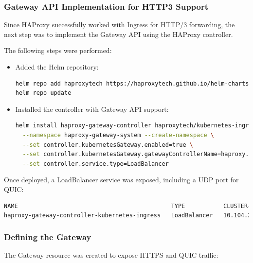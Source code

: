 \subsubsection{Gateway API Implementation for HTTP3 Support}

Since HAProxy successfully worked with Ingress for HTTP/3 forwarding, the next step was to implement the Gateway API using the HAProxy controller.


The following steps were performed:

\begin{itemize}
  \item Added the Helm repository:
\begin{lstlisting}[language=bash]
helm repo add haproxytech https://haproxytech.github.io/helm-charts
helm repo update
\end{lstlisting}

  \item Installed the controller with Gateway API support:
\begin{lstlisting}[language=bash]
helm install haproxy-gateway-controller haproxytech/kubernetes-ingress \
  --namespace haproxy-gateway-system --create-namespace \
  --set controller.kubernetesGateway.enabled=true \
  --set controller.kubernetesGateway.gatewayControllerName=haproxy.org/gateway-controller \
  --set controller.service.type=LoadBalancer
\end{lstlisting}
\end{itemize}

Once deployed, a LoadBalancer service was exposed, including a UDP port for QUIC:

\begin{lstlisting}[language=bash]
NAME                                            TYPE           CLUSTER-IP     EXTERNAL-IP    PORT(S)                                                                  AGE
haproxy-gateway-controller-kubernetes-ingress   LoadBalancer   10.104.20.31   192.168.49.5   80:31433/TCP,443:32261/TCP,443:32261/UDP,1024:30450/TCP,6060:31286/TCP   117s
\end{lstlisting}

\subsubsection{Defining the Gateway}

The Gateway resource was created to expose HTTPS and QUIC traffic:

